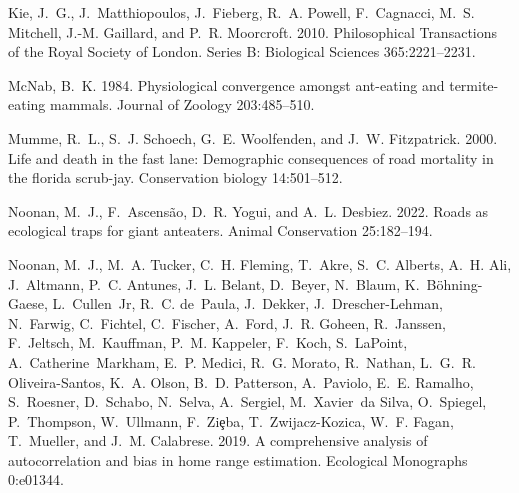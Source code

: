 \documentclass[11pt]{article}
\begin{document}
\begin{thebibliography}{40}
Kie, J.~G., J.~Matthiopoulos, J.~Fieberg, R.~A. Powell, F.~Cagnacci, M.~S.
  Mitchell, J.-M. Gaillard, and P.~R. Moorcroft. 2010.
\newblock Philosophical Transactions of the Royal Society of London. Series B:
  Biological Sciences 365:2221--2231.

McNab, B.~K. 1984.
\newblock Physiological convergence amongst ant-eating and termite-eating
  mammals.
\newblock Journal of Zoology 203:485--510.

Mumme, R.~L., S.~J. Schoech, G.~E. Woolfenden, and J.~W. Fitzpatrick. 2000.
\newblock Life and death in the fast lane: Demographic consequences of road
  mortality in the florida scrub-jay.
\newblock Conservation biology 14:501--512.

Noonan, M.~J., F.~Ascens{\~a}o, D.~R. Yogui, and A.~L. Desbiez. 2022.
\newblock Roads as ecological traps for giant anteaters.
\newblock Animal Conservation 25:182--194.

Noonan, M.~J., M.~A. Tucker, C.~H. Fleming, T.~Akre, S.~C. Alberts, A.~H. Ali,
  J.~Altmann, P.~C. Antunes, J.~L. Belant, D.~Beyer, N.~Blaum,
  K.~B{\"o}hning-Gaese, L.~Cullen~Jr, R.~C. de~Paula, J.~Dekker,
  J.~Drescher-Lehman, N.~Farwig, C.~Fichtel, C.~Fischer, A.~Ford, J.~R. Goheen,
  R.~Janssen, F.~Jeltsch, M.~Kauffman, P.~M. Kappeler, F.~Koch, S.~LaPoint,
  A.~Catherine~Markham, E.~P. Medici, R.~G. Morato, R.~Nathan, L.~G.~R.
  Oliveira-Santos, K.~A. Olson, B.~D. Patterson, A.~Paviolo, E.~E. Ramalho,
  S.~Roesner, D.~Schabo, N.~Selva, A.~Sergiel, M.~Xavier~da Silva, O.~Spiegel,
  P.~Thompson, W.~Ullmann, F.~Zi{\c e}ba, T.~Zwijacz-Kozica, W.~F. Fagan,
  T.~Mueller, and J.~M. Calabrese. 2019.
\newblock A comprehensive analysis of autocorrelation and bias in home range
  estimation.
\newblock Ecological Monographs 0:e01344.


\end{thebibliography}
\end{document}
